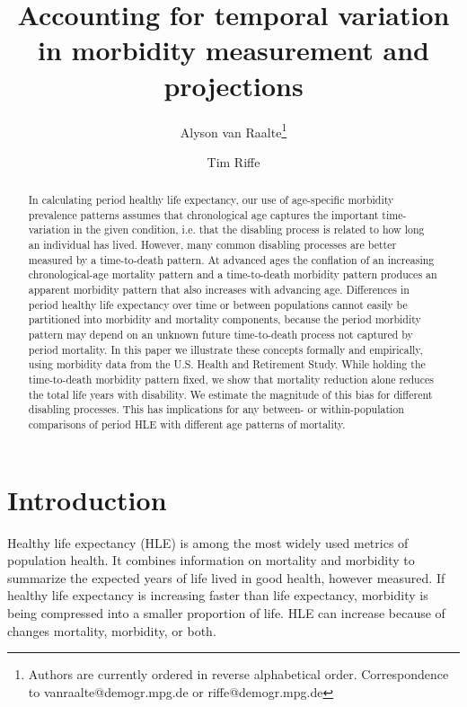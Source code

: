\documentclass[11pt,oneside,a4paper]{article} %
\begin{document}
\title{Accounting for temporal variation in morbidity measurement
and projections}

\author[1]{Alyson van Raalte\thanks{Authors are currently ordered in reverse
alphabetical order. Correspondence to vanraalte@demogr.mpg.de or
riffe@demogr.mpg.de}}
\author[1]{Tim Riffe}


\maketitle

\begin{abstract}
In calculating period healthy life expectancy, our use of age-specific morbidity
prevalence patterns assumes that chronological age captures the important
time-variation in the given condition, i.e.
that the disabling process is related to how long an individual has lived.
However, many common disabling processes are better measured by a time-to-death
pattern. At advanced ages the conflation of an increasing chronological-age
mortality pattern and a time-to-death morbidity pattern produces an apparent morbidity pattern that also increases with advancing age. Differences in period healthy life expectancy over time or between populations
cannot easily be partitioned into morbidity and mortality components, because
the period morbidity pattern may depend on an unknown future time-to-death
process not captured by period mortality. In this paper we illustrate these
concepts formally and empirically, using morbidity data from the U.S. Health and Retirement Study. While holding
the time-to-death morbidity pattern fixed, we show that mortality reduction
alone reduces the total life years with disability. We estimate the magnitude of this bias for different disabling processes. This has implications for any between- or within-population comparisons of period HLE with different age patterns of mortality.
\end{abstract}

\newpage
\section{Introduction}

Healthy life expectancy (HLE) is among the most widely used metrics of
population health. It combines information on mortality and morbidity to summarize the expected years of life lived in good health, however measured. If healthy life expectancy is increasing faster than life expectancy, morbidity is being compressed into a smaller proportion of life. HLE can increase because of changes mortality, morbidity, or both.
\end{document}
